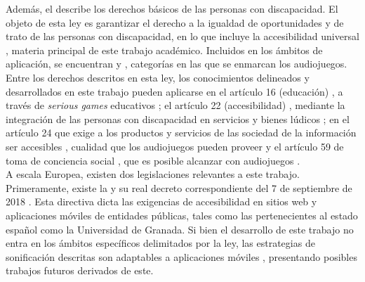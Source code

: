  Además, el  describe los derechos básicos de las personas con discapacidad. El objeto de esta ley es garantizar el derecho a la igualdad de oportunidades y de trato de las personas con discapacidad, en lo que incluye la accesibilidad universal \cite[p ~ 10]{ministeriodesanidadserviciossocialeseigualdadRealDecretoLegislativo2013}, materia principal de este trabajo académico. Incluidos en los ámbitos de aplicación, se encuentran  y  \cite[p ~ 13]{ministeriodesanidadserviciossocialeseigualdadRealDecretoLegislativo2013}, categorías en las que se enmarcan los audiojuegos. Entre los derechos descritos en esta ley, los conocimientos delineados y desarrollados en este trabajo pueden aplicarse en el artículo 16 (educación) \cite[p ~ 17]{ministeriodesanidadserviciossocialeseigualdadRealDecretoLegislativo2013}, a través de \textit{serious games} educativos \cite{cabrera-solanoUseAudiogamesStrategic2020}; el artículo 22 (accesibilidad) \cite[p ~ 19]{ministeriodesanidadserviciossocialeseigualdadRealDecretoLegislativo2013}, mediante la integración de las personas con discapacidad en servicios y bienes lúdicos \cite{andradeIntroducingGamerInformationControl2020}; en el artículo 24 que exige a los productos y servicios de las sociedad de la información ser accesibles \cite[p ~ 20]{ministeriodesanidadserviciossocialeseigualdadRealDecretoLegislativo2013}, cualidad que los audiojuegos pueden proveer \cite{campoverdeAudiojuegosNuevaHerramienta2020} y el artículo 59 de toma de conciencia social \cite[p ~30]{ministeriodesanidadserviciossocialeseigualdadRealDecretoLegislativo2013}, que es posible alcanzar con audiojuegos \cite{siqueiradasilvaPromotionEmpathyExperience2019}. \\
 
 A escala Europea, existen dos legislaciones relevantes a este trabajo. Primeramente, existe la  \cite{DirectiveEU20162016} y su real decreto correspondiente del 7 de septiembre de 2018 \cite{ministeriodelapresidenciarelacionesconlascorteseigualdadRealDecreto11122018}. Esta directiva dicta las exigencias de accesibilidad en sitios web y aplicaciones móviles de entidades públicas, tales como las pertenecientes al estado español como la Universidad de Granada. Si bien el desarrollo de este trabajo no entra en los ámbitos específicos delimitados por la ley, las estrategias de sonificación descritas son adaptables a aplicaciones móviles \cite{cordeiroMurkyShootingUse2012}, presentando posibles trabajos futuros derivados de este.  \\
 
